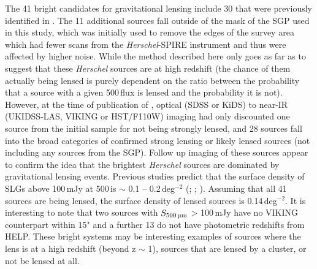 The 41 bright candidates for gravitational lensing include 30 that were previously identified in \citealt{Negrello_2017}. The 11 additional sources fall outside of the mask of the SGP used in this study, which was initially used to remove the edges of the survey area which had fewer scans from the \textit{Herschel}-SPIRE instrument and thus were affected by higher noise. While the method described here only goes as far as to suggest that these \textit{Herschel} sources are at high redshift (the chance of them actually being lensed is purely dependent on the ratio between the probability that a source with a given 500\,\micron flux is lensed and the probability it is not). However, at the time of publication of \citealt{Negrello_2017}, optical (SDSS or KiDS) to near-IR (UKIDSS-LAS, VIKING or HST/F110W) imaging had only discounted one source from the initial sample for not being strongly lensed, and 28 sources fall into the broad categories of confirmed strong lensing or likely lensed sources (not including any sources from the SGP). Follow up imaging of these sources appear to confirm the idea that the brightest \textit{Herschel} sources are dominated by gravitational lensing events. Previous studies predict that the surface density of SLGs above 100\,mJy at 500\,\micron is $\sim$ 0.1 -- 0.2\,deg$^{-2}$ (\citealt{Vieira_2010}; \citealt{Wardlow_2013}; \citealt{Nayyeri_2016}). Assuming that all 41 sources are being lensed, the surface density of lensed sources is 0.14\,deg$^{-2}$. It is interesting to note that two sources with $S_{\textrm{500\,\micron}}$ > 100\,mJy have no VIKING counterpart within 15" and a further 13 do not have photometric redshifts from HELP. These bright systems may be interesting examples of sources where the lens is at a high redshift (beyond z $\sim$ 1), sources that are lensed by a cluster, or not be lensed at all.

